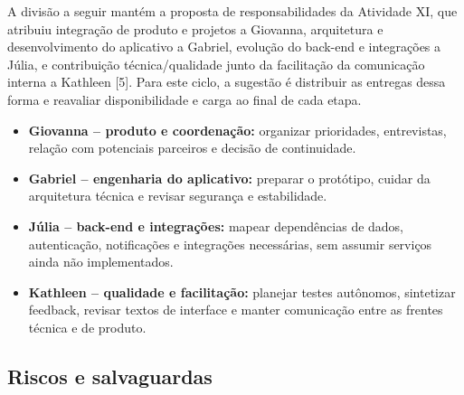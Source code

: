 \documentclass[12pt,a4paper]{article}
\begin{document}
A divisão a seguir mantém a proposta de responsabilidades da Atividade XI, que atribuiu integração de produto e projetos a Giovanna, arquitetura e desenvolvimento do aplicativo a Gabriel, evolução do back-end e integrações a Júlia, e contribuição técnica/qualidade junto da facilitação da comunicação interna a Kathleen [5]. Para este ciclo, a sugestão é distribuir as entregas dessa forma e reavaliar disponibilidade e carga ao final de cada etapa.

\begin{itemize}
\item \textbf{Giovanna -- produto e coordenação:} organizar prioridades, entrevistas, relação com potenciais parceiros e decisão de continuidade.
\item \textbf{Gabriel -- engenharia do aplicativo:} preparar o protótipo, cuidar da arquitetura técnica e revisar segurança e estabilidade.
\item \textbf{Júlia -- back-end e integrações:} mapear dependências de dados, autenticação, notificações e integrações necessárias, sem assumir serviços ainda não implementados.
\item \textbf{Kathleen -- qualidade e facilitação:} planejar testes autônomos, sintetizar feedback, revisar textos de interface e manter comunicação entre as frentes técnica e de produto.
\end{itemize}

\subsection{Riscos e salvaguardas}
\end{document}
